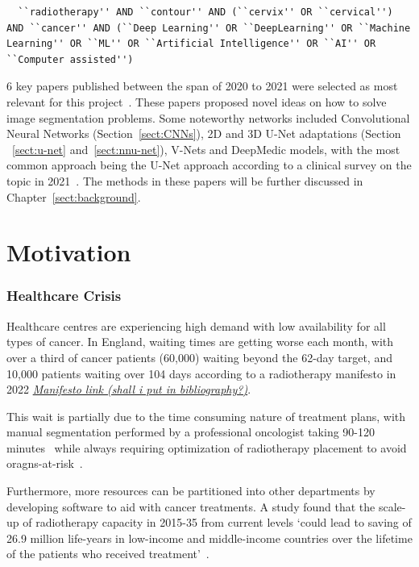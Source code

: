 \documentclass[11pt,twoside]{report}
\begin{document}
\begin{lstlisting}
  ``radiotherapy'' AND ``contour'' AND (``cervix'' OR ``cervical'') AND ``cancer'' AND (``Deep Learning'' OR ``DeepLearning'' OR ``Machine Learning'' OR ``ML'' OR ``Artificial Intelligence'' OR ``AI'' OR ``Computer assisted'')  
\end{lstlisting}

6 key papers published between the span of 2020 to 2021 were selected as most relevant for this project~\cite{Samarasinghe2021-ps,Lin2021-oz,Sartor2020-et,LIU2020184,Rhee2020-ms,LIU2020172}. These papers proposed novel ideas on how to solve image segmentation problems. Some noteworthy networks included Convolutional Neural Networks (Section~\ref{sect:CNNs}), 2D and 3D U-Net adaptations (Section ~\ref{sect:u-net} and~\ref{sect:nnu-net}), V-Nets and DeepMedic models, with the most common approach being the U-Net approach according to a clinical survey on the topic in 2021~\cite{Samarasinghe2021-ps}. The methods in these papers will be further discussed in Chapter~\ref{sect:background}.

\section{Motivation}\label{sect:motivation}

\subsubsection{Healthcare Crisis}

Healthcare centres are experiencing high demand with low availability for all types of cancer. In England, waiting times are getting worse each month, with over a third of cancer patients (60,000) waiting beyond the 62-day target, and 10,000 patients waiting over 104 days according to a radiotherapy manifesto in 2022 \href{https://radiotherapy.org.uk/wp-content/uploads/2022/11/APPGRadiotherapy_Manifesto-Update_2022.pdf}{\textit{Manifesto link (shall i put in bibliography?)}}. 

This wait is partially due to the time consuming nature of treatment plans, with manual segmentation performed by a professional oncologist taking 90-120 minutes~\cite{LIU2020184,Sartor2020-et} while always requiring optimization of radiotherapy placement to avoid oragns-at-risk~\cite{Samarasinghe2021-ps}.

Furthermore, more resources can be partitioned into other departments by developing software to aid with cancer treatments. A study found that the scale-up of radiotherapy capacity in 2015-35 from current levels `could lead to saving of 26.9 million life-years in low-income and middle-income countries over the lifetime of the patients who received treatment'~\cite{expanding-global-access-to-radiotherapy}.
\end{document}
